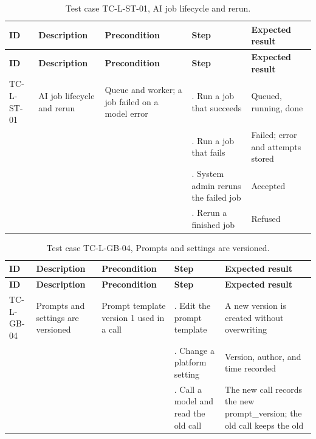 {\small
\begin{longtable}{|>{\raggedright\arraybackslash}p{}|>{\raggedright\arraybackslash}p{}|>{\raggedright\arraybackslash}p{}|>{\raggedright\arraybackslash}p{}|>{\raggedright\arraybackslash}p{}|}
\caption{Test case TC-L-ST-01, AI job lifecycle and rerun.} \\
\hline
\textbf{ID} & \textbf{Description} & \textbf{Precondition} & \textbf{Step} & \textbf{Expected result} \\ \hline
\endfirsthead
\hline
\textbf{ID} & \textbf{Description} & \textbf{Precondition} & \textbf{Step} & \textbf{Expected result} \\ \hline
\endhead
TC-L-ST-01 & AI job lifecycle and rerun & Queue and worker; a job failed on a model error & 1. Run a job that succeeds & Queued, running, done \\ \hline
 &  &  & 2. Run a job that fails & Failed; error and attempts stored \\ \hline
 &  &  & 3. System admin reruns the failed job & Accepted \\ \hline
 &  &  & 4. Rerun a finished job & Refused \\ \hline
\end{longtable}
}

{\small
\begin{longtable}{|>{\raggedright\arraybackslash}p{}|>{\raggedright\arraybackslash}p{}|>{\raggedright\arraybackslash}p{}|>{\raggedright\arraybackslash}p{}|>{\raggedright\arraybackslash}p{}|}
\caption{Test case TC-L-GB-04, Prompts and settings are versioned.} \\
\hline
\textbf{ID} & \textbf{Description} & \textbf{Precondition} & \textbf{Step} & \textbf{Expected result} \\ \hline
\endfirsthead
\hline
\textbf{ID} & \textbf{Description} & \textbf{Precondition} & \textbf{Step} & \textbf{Expected result} \\ \hline
\endhead
TC-L-GB-04 & Prompts and settings are versioned & Prompt template version 1 used in a call & 1. Edit the prompt template & A new version is created without overwriting \\ \hline
 &  &  & 2. Change a platform setting & Version, author, and time recorded \\ \hline
 &  &  & 3. Call a model and read the old call & The new call records the new prompt\_version; the old call keeps the old \\ \hline
\end{longtable}
}


